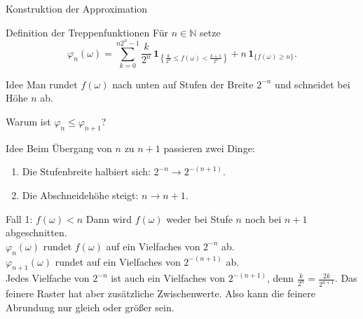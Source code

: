 \documentclass{beamer}
\begin{document}
\begin{frame}{Konstruktion der Approximation}
\begin{block}{Definition der Treppenfunktionen}
Für \(n\in\mathbb N\) setze
\[
\varphi_n(\omega)
=
\sum_{k=0}^{n2^n-1}
\frac{k}{2^n}\,
\mathbf 1_{\left\{
\frac{k}{2^n}\le f(\omega)<\frac{k+1}{2^n}
\right\}}
+
n\,\mathbf 1_{\{f(\omega)\ge n\}}.
\]
\end{block}

\begin{block}{Idee}
Man rundet \(f(\omega)\) nach unten auf Stufen der Breite \(2^{-n}\) und schneidet bei Höhe \(n\) ab.
\end{block}
\end{frame}

\begin{frame}{Warum ist \(\varphi_n\le\varphi_{n+1}\)?}
\begin{block}{Idee}
Beim Übergang von \(n\) zu \(n+1\) passieren zwei Dinge:
\begin{enumerate}
    \item Die Stufenbreite halbiert sich: \(2^{-n}\to 2^{-(n+1)}\).
    \item Die Abschneidehöhe steigt: \(n\to n+1\).
\end{enumerate}
\end{block}

\begin{block}{Fall 1: \(f(\omega)<n\)}
Dann wird \(f(\omega)\) weder bei Stufe \(n\) noch bei \(n+1\) abgeschnitten.
\\[4pt]
\(\varphi_n(\omega)\) rundet \(f(\omega)\) auf ein Vielfaches von \(2^{-n}\) ab.
\\
\(\varphi_{n+1}(\omega)\) rundet auf ein Vielfaches von \(2^{-(n+1)}\) ab.
\\[4pt]
Jedes Vielfache von \(2^{-n}\) ist auch ein Vielfaches von \(2^{-(n+1)}\), denn \(\tfrac{k}{2^n}=\tfrac{2k}{2^{n+1}}\).
Das feinere Raster hat aber zusätzliche Zwischenwerte. Also kann die feinere Abrundung nur gleich oder größer sein.
\end{block}
\end{frame}
\end{document}
